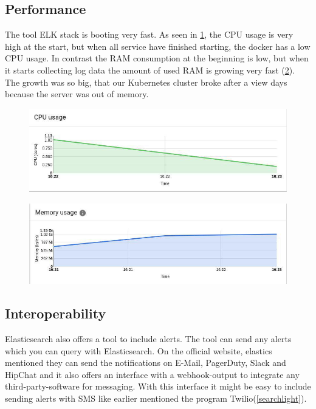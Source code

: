 \subsection{Performance}
The tool ELK stack is booting very fast. As seen in \cref{fig:ELK_CPU}, the CPU usage is very high at the start, but when all service have finished starting, the docker has a low CPU usage. In contrast the RAM consumption at the beginning is low, but when it starts collecting log data the amount of used RAM is growing very fast (\cref{fig:ELK_MEM}). The growth was so big, that our Kubernetes cluster broke after a view days because the server was out of memory.
\begin{figure}
	\centering
	\includegraphics[width=1\linewidth]{Bilder/Performance/ELK_CPU}
	\caption{}
	\label{fig:ELK_CPU}
\end{figure}
\begin{figure}
	\centering
	\includegraphics[width=1\linewidth]{Bilder/Performance/ELK_MEM}
	\caption{}
	\label{fig:ELK_MEM}
\end{figure}
\subsection{Interoperability}
Elasticsearch also offers a tool to include alerts. The tool can send any alerts which you can query with Elasticsearch. On the official website, elastics mentioned they can send the notifications on E-Mail, PagerDuty, Slack and HipChat and it also offers an interface with a webhook-output to integrate any third-party-software for messaging. With this interface it might be easy to include sending alerts with SMS like earlier mentioned the program Twilio(\ref{searchlight}).
